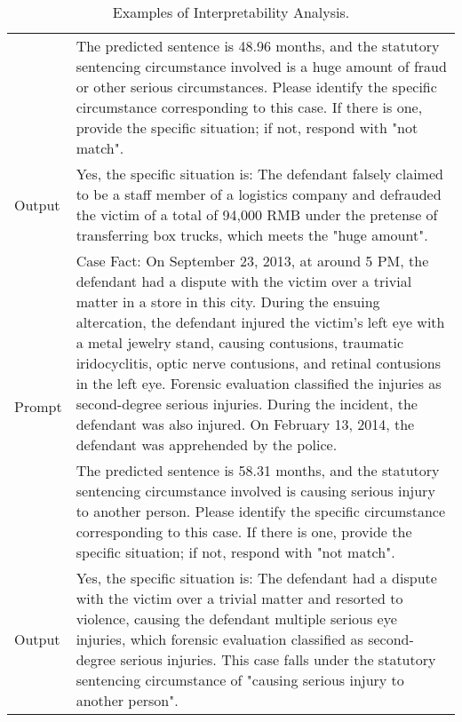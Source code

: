 \begin{table*}[]
\begin{tabular}{p{}|p{}}
    & The predicted sentence is 48.96 months, and the statutory sentencing circumstance involved is a huge amount of fraud or other serious circumstances. Please identify the specific circumstance corresponding to this case. If there is one, provide the specific situation; if not, respond with "not match".\\
    Output & Yes, the specific situation is: The defendant falsely claimed to be a staff member of a logistics company and defrauded the victim of a total of 94,000 RMB under the pretense of transferring box trucks, which meets the "huge amount". \\
    \midrule
    \multirow{2}{*}{Prompt}  &  Case Fact: On September 23, 2013, at around 5 PM, the defendant had a dispute with the victim over a trivial matter in a store in this city. During the ensuing altercation, the defendant injured the victim's left eye with a metal jewelry stand, causing contusions, traumatic iridocyclitis, optic nerve contusions, and retinal contusions in the left eye. Forensic evaluation classified the injuries as second-degree serious injuries. During the incident, the defendant was also injured. On February 13, 2014, the defendant was apprehended by the police.\\
    & The predicted sentence is 58.31 months, and the statutory sentencing circumstance involved is causing serious injury to another person. Please identify the specific circumstance corresponding to this case. If there is one, provide the specific situation; if not, respond with "not match".\\
    Output & Yes, the specific situation is: The defendant had a dispute with the victim over a trivial matter and resorted to violence, causing the defendant multiple serious eye injuries, which forensic evaluation classified as second-degree serious injuries. This case falls under the statutory sentencing circumstance of "causing serious injury to another person". \\
    \bottomrule
    \end{tabular}
    \caption{Examples of Interpretability Analysis.}
    \label{tab:rex}
\end{table*}